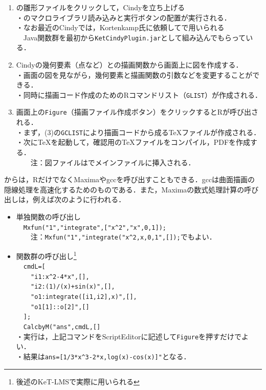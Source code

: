 \documentclass[a4j,12pt]{ujarticle}
\begin{document}
\begin{enumerate}
\item \ketcindy の雛形ファイルをクリックして，Cindyを立ち上げる\\
・\ketcindy のマクロライブラリ読み込みと実行ボタンの配置が実行される．\\
・なお最近のCindyでは，Kortenkamp氏に依頼して\ketcindy で用いられる\\
　Java関数群を最初から\verb|KetCindyPlugin.jar|として組み込んでもらっている．\vspace{-2mm}
\item Cindyの幾何要素（点など）と\ketcindy の描画関数から画面上に図を作成する．\\
・画面の図を見ながら，幾何要素と描画関数の引数などを変更することができる．\\
・同時に描画コード作成のためのRコマンドリスト（\verb|GLIST|）が作成される．

\vspace{-2mm}
\item 画面上の\verb|Figure|（描画ファイル作成ボタン）をクリックするとRが呼び出される．\\
・まず，(3)の\verb|GCLIST|により描画コードから成る\TeX ファイルが作成される．\\
・次に\TeX を起動して，確認用の\TeX ファイルをコンパイル，PDFを作成する．\\
　　注：図ファイルは\verb||でメインファイルに挿入される．\vspace{-1mm}
\end{enumerate}

\ketcindy からは，RだけでなくMaximaやgccを呼び出すこともできる．gccは\ketcindy 曲面描画の隠線処理を高速化するためのものである．また，Maximaの数式処理計算の呼び出しは，例えば次のように行われる．\vspace{-1mm}

\begin{itemize}
\item 単独関数の呼び出し\\
　\verb|Mxfun("1","integrate",["x^2","x",0,1]);|\\
　　注：\verb|Mxfun("1","integrate("x^2,x,0,1",[]);|でもよい．\vspace{-2mm}
\item 関数群の呼び出し\footnote{後述のKeT-LMSで実際に用いられる}\\
　\verb|cmdL=[|\\
　\verb|  "i1:x^2-4*x",[],|\\
　\verb|  "i2:(1)/(x)+sin(x)",[],|\\
　\verb|  "o1:integrate([i1,i2],x)",[],|\\
　\verb|  "o1[1]::o[2]",[]|\\
　\verb|];|\\
　\verb|CalcbyM("ans",cmdL,[]|\\
・実行は，上記コマンドをScriptEditorに記述して\verb|Figure|を押すだけでよい．\\
・結果は\verb|ans=[1/3*x^3-2*x,log(x)-cos(x)]"|となる．\vspace{-1mm}
\end{itemize}
\end{document}
